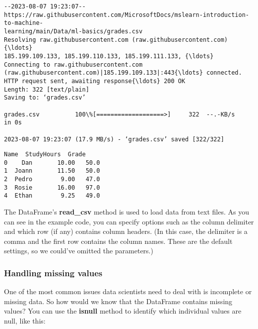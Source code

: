 \documentclass[11pt]{article}
\makeatletter
\newcommand{\boxspacing}{\kern\kvtcb@left@rule\kern\kvtcb@boxsep}
\newcommand{\prompt}[4]{
        {\ttfamily\llap{{\color{#2}[#3]:\hspace{3pt}#4}}\vspace{-\baselineskip}}
    }
\makeatother
\begin{document}
    \begin{Verbatim}[commandchars=\\\{\}]
--2023-08-07 19:23:07--
https://raw.githubusercontent.com/MicrosoftDocs/mslearn-introduction-to-machine-
learning/main/Data/ml-basics/grades.csv
Resolving raw.githubusercontent.com (raw.githubusercontent.com){\ldots}
185.199.109.133, 185.199.110.133, 185.199.111.133, {\ldots}
Connecting to raw.githubusercontent.com
(raw.githubusercontent.com)|185.199.109.133|:443{\ldots} connected.
HTTP request sent, awaiting response{\ldots} 200 OK
Length: 322 [text/plain]
Saving to: ‘grades.csv’

grades.csv          100\%[===================>]     322  --.-KB/s    in 0s

2023-08-07 19:23:07 (17.9 MB/s) - ‘grades.csv’ saved [322/322]

    \end{Verbatim}

            \begin{tcolorbox}[breakable, size=fbox, boxrule=.5pt, pad at break*=1mm, opacityfill=0]
\prompt{Out}{outcolor}{47}{\boxspacing}
\begin{Verbatim}[commandchars=\\\{\}]
    Name  StudyHours  Grade
0    Dan       10.00   50.0
1  Joann       11.50   50.0
2  Pedro        9.00   47.0
3  Rosie       16.00   97.0
4  Ethan        9.25   49.0
\end{Verbatim}
\end{tcolorbox}
        
    The DataFrame's \textbf{read\_csv} method is used to load data from text
files. As you can see in the example code, you can specify options such
as the column delimiter and which row (if any) contains column headers.
(In this case, the delimiter is a comma and the first row contains the
column names. These are the default settings, so we could've omitted the
parameters.)

\hypertarget{handling-missing-values}{%
\subsubsection{Handling missing values}\label{handling-missing-values}}

One of the most common issues data scientists need to deal with is
incomplete or missing data. So how would we know that the DataFrame
contains missing values? You can use the \textbf{isnull} method to
identify which individual values are null, like this:
\end{document}
